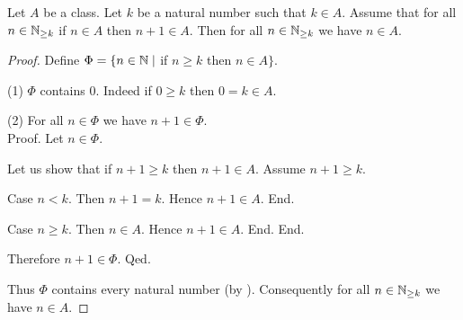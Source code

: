 \documentclass[10pt]{article}
\begin{document}
  \begin{forthel}
    \begin{theorem}
      Let $A$ be a class.
      Let $k$ be a natural number such that $k \in A$.
      Assume that for all $n \in \mathbb{N}_{\geq k}$ if $n \in A$ then $n + 1 \in A$.
      Then for all $n \in \mathbb{N}_{\geq k}$ we have $n \in A$.
    \end{theorem}
    \begin{proof}
      Define $\Phi = \{n \in \mathbb{N} \mid$ if $n \geq k$ then $n \in A \}$.

      (1) $\Phi$ contains $0$.
      Indeed if $0 \geq k$ then $0 = k \in A$.

      (2) For all $n \in \Phi$ we have $n + 1 \in \Phi$. \\
      Proof.
        Let $n \in \Phi$.

        Let us show that if $n + 1 \geq k$ then $n + 1 \in A$.
          Assume $n + 1 \geq k$.

          Case $n < k$.
            Then $n + 1 = k$.
            Hence $n + 1 \in A$.
          End.

          Case $n \geq k$.
            Then $n \in A$.
            Hence $n + 1 \in A$.
          End.
        End.

        Therefore $n + 1 \in \Phi$.
      Qed.

      Thus $\Phi$ contains every natural number (by ).
      Consequently for all $n \in \mathbb{N}_{\geq k}$ we have $n \in A$.
    \end{proof}
  \end{forthel}
\end{document}
